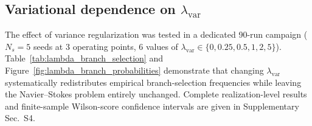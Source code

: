 \documentclass[a4paper,11pt]{article}
\begin{document}
\subsection{Variational dependence on \(\lambda_{\mathrm{var}}\)}
\label{sec:lambda_var}

The effect of variance regularization was tested in a dedicated 90-run campaign
(\(N_s=5\) seeds at 3 operating points, 6 values of
\(\lambda_{\mathrm{var}}\in\{0,0.25,0.5,1,2,5\}\)).
Table~\ref{tab:lambda_branch_selection} and
Figure~\ref{fig:lambda_branch_probabilities} demonstrate that changing
\(\lambda_{\mathrm{var}}\) systematically redistributes empirical branch-selection
frequencies while leaving the Navier--Stokes problem entirely unchanged. Complete
realization-level results and finite-sample Wilson-score confidence intervals are
given in Supplementary Sec.~S4.
\end{document}
